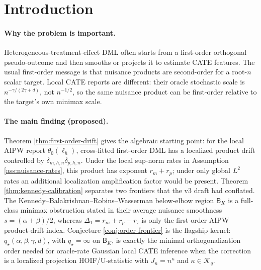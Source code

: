 \documentclass[11pt]{article}
\theoremstyle{definition}
\theoremstyle{plain}
\theoremstyle{remark}
\begin{document}
\section{Introduction}
\paragraph{Why the problem is important.}
Heterogeneous-treatment-effect DML often starts from a first-order
orthogonal pseudo-outcome and then smooths or projects it to estimate CATE
features.  The usual first-order message is that nuisance products are
second-order for a root-\(n\) scalar target.  Local CATE reports are different:
their oracle stochastic scale is \(n^{-\gamma/(2\gamma+d)}\), not
\(n^{-1/2}\), so the same nuisance product can be first-order relative to the
target's own minimax scale.

\paragraph{The main finding (proposed).}
Theorem \ref{thm:first-order-drift} gives the algebraic starting point: for
the local AIPW report \(\theta_0(\ell_h)\), cross-fitted first-order DML has a
localized product drift controlled by
\(\delta_{m,h,n}\delta_{p,h,n}\).  Under the local sup-norm rates in
Assumption \ref{ass:nuisance-rates}, this product has exponent
\(r_m+r_p\); under only global \(L^2\) rates an additional localization
amplification factor would be present.  Theorem
\ref{thm:kennedy-calibration} separates two frontiers that the v3 draft had
conflated.  The Kennedy--Balakrishnan--Robins--Wasserman below-elbow region
\(\mathsf B_K\) is a full-class minimax obstruction stated in their average
nuisance smoothness \(s=(\alpha+\beta)/2\), whereas
\(\Delta_1=r_m+r_p-r_\tau\) is only the first-order AIPW product-drift index.
Conjecture \ref{conj:order-frontier} is the flagship kernel:
\(q_\star(\alpha,\beta,\gamma,d)\), with \(q_\star=\infty\) on
\(\mathsf B_K\), is exactly the minimal orthogonalization order needed for
oracle-rate Gaussian local CATE inference when the correction is a localized
projection HOIF/U-statistic with \(J_n=n^\kappa\) and
\(\kappa\in\mathcal K_q\).
\end{document}
